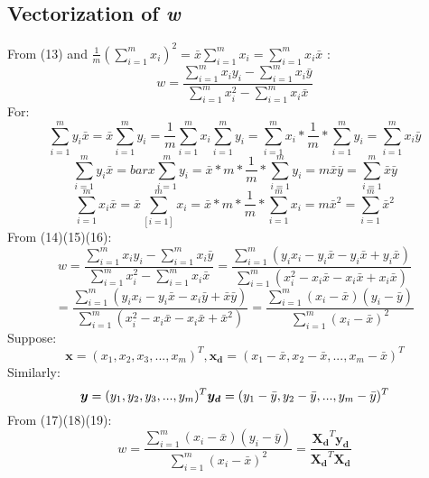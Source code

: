 \documentclass{article}
\begin{document}
\subsection{Vectorization of \textit{w}}
From (13) and $\frac{1}{m}(\sum_{i=1}^m x_i)^2 = \bar{x} \sum_{i=1}^m x_i = \sum_{i=1}^m x_i \bar{x} $ :
\[w = \frac{\sum_{i=1}^m x_i y_i - \sum_{i=1}^m x_i \bar{y}}{\sum_{i=1}^m x_i^2 - \sum_{i=1}^m x_i \bar{x}}\]
For:
\begin{equation}
\sum_{i=1}^m y_i \bar{x} = \bar{x} \sum_{i=1}^m y_i = \frac{1}{m} \sum_{i=1}^m x_i \sum_{i=1}^m y_i = \sum_{i=1}^m x_i \ast \frac{1}{m} \ast \sum_{i=1}^m y_i = \sum_{i=1}^m x_i \bar{y}
\end{equation}
\begin{equation}
\sum_{i=1}^m y_i \bar{x} = bar{x} \sum_{i=1}^m y_i = \bar{x} \ast m \ast \frac{1}{m} \ast \sum_{i=1}^m y_i = m \bar{x}\bar{y} = \sum_{i=1}^m \bar{x}\bar{y}
\end{equation}
\begin{equation}
\sum_{i=1}^m x_i \bar{x} = \bar{x} \sum_[i=1]^m x_i = \bar{x} \ast m \ast \frac{1}{m} \ast \sum_{i=1}^m x_i = m\bar{x}^2 = \sum_{i=1}^m \bar{x}^2
\end{equation}
From (14)(15)(16):
\[w = \frac{\sum_{i=1}^m x_i y_i - \sum_{i=1}^m x_i \bar{y}}{\sum_{i=1}^m x_i^2 - \sum_{i=1}^m x_i \bar{x}} = \frac{\sum_{i=1}^m (y_i x_i - y_i \bar{x} - y_i \bar{x} + y_i \bar{x})}{\sum_{i=1}^m (x_i^2 - x_i\bar{x} - x_i\bar{x} + x_i\bar{x})}\] 
\begin{equation}
= \frac{\sum_{i=1}^m(y_i x_i - y_i \bar{x} - x_i \bar{y} + \bar{x}\bar{y})}{\sum_{i=1}^m (x_i^2 - x_i\bar{x} - x_i\bar{x} + \bar{x}^2)} = \frac{\sum_{i=1}^m (x_i - \bar{x})(y_i - \bar{y})}{\sum_{i=1}^m (x_i - \bar{x})^2}
\end{equation}
Suppose:
\begin{equation}
\boldsymbol{x} = (x_1, x_2, x_3,...,x_m)^T
, \boldsymbol{x_d} = (x_1 - \bar{x}, x_2 - \bar{x},...,x_m - \bar{x})^T
\end{equation}
Similarly: 
\begin{equation}
\newline\boldsymbol{y} = (y_1, y_2, y_3,...,y_m)^T
\newline\boldsymbol{y_d} = (y_1 - \bar{y}, y_2 - \bar{y},...,y_m - \bar{y})^T 
\end{equation}
From (17)(18)(19):
\begin{equation}
w = \frac{\sum_{i=1}^m (x_i - \bar{x})(y_i - \bar{y})}{\sum_{i=1}^m (x_i - \bar{x})^2} = \frac{\boldsymbol{X_d}^T \boldsymbol{y_d}}{\boldsymbol{X_d}^T \boldsymbol{X_d}}
\end{equation}



\end{document}
